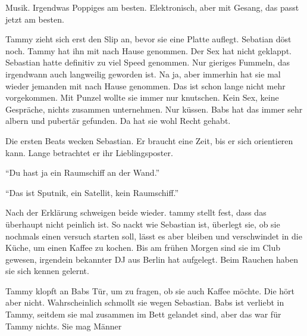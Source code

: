 Musik. Irgendwas Poppiges am besten. Elektronisch, aber mit Gesang, das passt jetzt am besten.

Tammy zieht sich erst den Slip an, bevor sie eine Platte auflegt. Sebatian döst noch. Tammy hat ihn mit nach Hause genommen. Der Sex hat nicht geklappt. Sebastian hatte definitiv zu viel Speed genommen. Nur gieriges Fummeln, das irgendwann auch langweilig geworden ist. Na ja, aber immerhin hat sie mal wieder jemanden mit nach Hause genommen. Das ist schon lange nicht mehr vorgekommen. Mit Punzel wollte sie immer nur knutschen. Kein Sex, keine Gespräche, nichts zusammen unternehmen. Nur küssen. Babs hat das immer sehr albern und pubertär gefunden. Da hat sie wohl Recht gehabt.

Die ersten Beats wecken Sebastian. Er braucht eine Zeit, bis er sich orientieren kann. Lange betrachtet er ihr Lieblingsposter.

\enquote{Du hast ja ein Raumschiff an der Wand.}

\enquote{Das ist Sputnik, ein Satellit, kein Raumschiff.}

Nach der Erklärung schweigen beide wieder. tammy stellt fest, dass das überhaupt nicht peinlich ist. So nackt wie Sebastian ist, überlegt sie, ob sie nochmals einen versuch starten soll, lässt es aber bleiben und verschwindet in die Küche, um einen Kaffee zu kochen. Bis am frühen Morgen sind sie im Club gewesen, irgendein bekannter DJ aus Berlin hat aufgelegt. Beim Rauchen haben sie sich kennen gelernt. 

Tammy klopft an Babs Tür, um zu fragen, ob sie auch Kaffee möchte. Die hört aber nicht. Wahrscheinlich schmollt sie wegen Sebastian. Babs ist verliebt in Tammy, seitdem sie mal zusammen im Bett gelandet sind, aber das war für Tammy nichts. Sie mag Männer 

